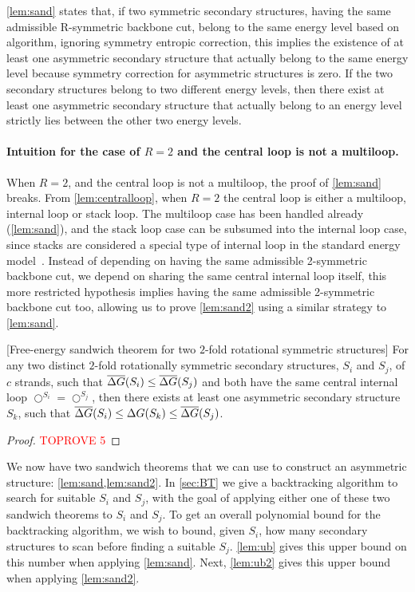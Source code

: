 \cref{lem:sand} states that, if two symmetric secondary structures, having the same admissible R-symmetric backbone cut, belong to the same energy level based on \symnMFE algorithm, ignoring symmetry entropic correction, this implies the existence of at least one asymmetric secondary structure that actually belong to the same energy level because symmetry  correction for asymmetric structures is zero. If the two secondary structures belong to two different energy levels, then there exist at least one asymmetric secondary structure that actually belong to an energy level strictly lies between the other two energy levels.


\paragraph{Intuition for the case of $R=2$ and the central loop is not a multiloop.} 
When $R=2$, and the central loop is not a multiloop, the proof of \cref{lem:sand} breaks.   
From \cref{lem:centralloop}, when $R=2$ the central loop is either a multiloop, internal loop or stack loop. 
The multiloop case has been handled already (\cref{lem:sand}), and the stack loop case can be subsumed into the  internal loop case, since stacks are considered a special type of internal loop in the standard energy model~\cite{dirks2007thermodynamic}. 
Instead of depending on having the same admissible 2-symmetric backbone cut, we depend on sharing the same central internal loop itself, this more restricted hypothesis   implies having the same admissible 2-symmetric backbone cut too, allowing us to prove \cref{lem:sand2} using a similar strategy to  \cref{lem:sand}.  


\begin{lemma}\label{lem:sand2}[Free-energy sandwich theorem for two $2$-fold rotational symmetric structures]
	For any two distinct  $2$-fold rotationally symmetric secondary structures, $S_i$ and $S_j$, of $c$ strands, such that $\overline{\Delta G}(S_i) \leq \overline{\Delta G}(S_j)$ and both have the same central internal loop $\bigcirc^{S_i} = \bigcirc^{S_j}$, then there exists at least one asymmetric secondary structure $S_k$, such that $\overline{\Delta G}(S_i) \leq \Delta G(S_k) \leq \overline{\Delta G}(S_j)$.  
\end{lemma}
\begin{proof}\textcolor{red}{TOPROVE 5}\end{proof}

We now have two sandwich theorems that we can use to construct an asymmetric structure: \cref{lem:sand,lem:sand2}. In \cref{sec:BT} we give a backtracking algorithm to search for suitable $S_i$ and $S_j$, with the goal of  applying either one of these two sandwich theorems to $S_i$ and $S_j$. 
To get an overall polynomial bound for the backtracking algorithm, we wish to bound, given $S_i$, how many secondary structures to scan before finding a suitable $S_j$.    
\cref{lem:ub} gives this upper bound on this number  when applying \cref{lem:sand}. 
Next, \cref{lem:ub2} gives this upper bound  when applying  \cref{lem:sand2}. 

